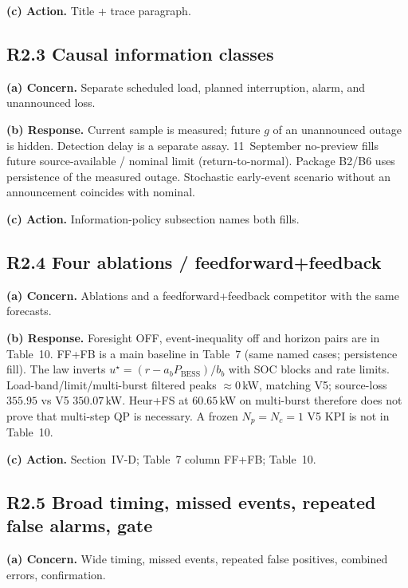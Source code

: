 \documentclass[11pt]{article}
\begin{document}
\textbf{(c) Action.} Title + trace paragraph.

\subsection*{R2.3 Causal information classes}
\textbf{(a) Concern.} Separate scheduled load, planned interruption, alarm, and unannounced loss.

\textbf{(b) Response.} Current sample is measured; future $g$ of an unannounced outage is hidden. Detection delay is a separate assay. 11~September no-preview fills future source-available / nominal limit (return-to-normal). Package B2/B6 uses persistence of the measured outage. Stochastic early-event scenario without an announcement coincides with nominal.

\textbf{(c) Action.} Information-policy subsection names both fills.

\subsection*{R2.4 Four ablations / feedforward+feedback}
\textbf{(a) Concern.} Ablations and a feedforward+feedback competitor with the same forecasts.

\textbf{(b) Response.} Foresight OFF, event-inequality off and horizon pairs are in Table~10. FF+FB is a main baseline in Table~7 (same named cases; persistence fill). The law inverts $u^\star=(r-a_b P_{\mathrm{BESS}})/b_b$ with SOC blocks and rate limits. Load-band/limit/multi-burst filtered peaks $\approx 0$\,kW, matching V5; source-loss $355.95$ vs V5 $350.07$\,kW. Heur+FS at $60.65$\,kW on multi-burst therefore does not prove that multi-step QP is necessary. A frozen $N_p=N_c=1$ V5 KPI is not in Table~10.

\textbf{(c) Action.} Section~IV-D; Table~7 column FF+FB; Table~10.

\subsection*{R2.5 Broad timing, missed events, repeated false alarms, gate}
\textbf{(a) Concern.} Wide timing, missed events, repeated false positives, combined errors, confirmation.
\end{document}
